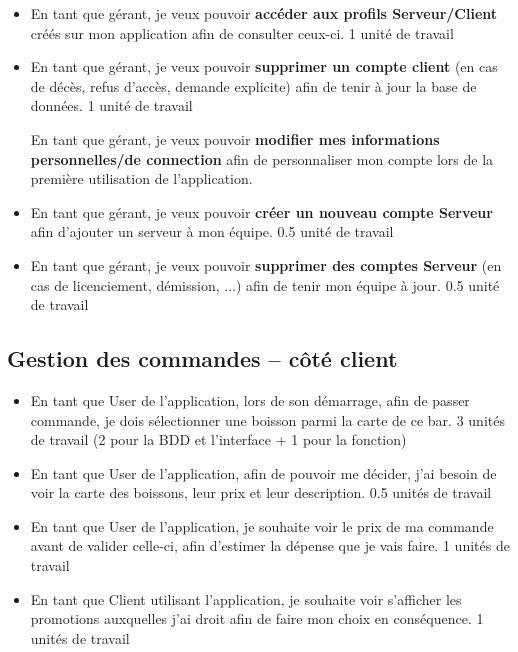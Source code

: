 \documentclass[11pt,a4paper]{article}
\begin{document}
\begin{spacing}{1.1}
\begin{itemize}[label=\textbullet,font=\color{cyan}]
\item En tant que gérant, je veux pouvoir \textbf{accéder aux profils Serveur/Client} créés sur mon application afin de consulter ceux-ci.
{\color{cyan} 1 unité de travail}

\item En tant que gérant, je veux pouvoir \textbf{supprimer un compte client} (en cas de décès, refus d'accès, demande explicite) afin de tenir à jour la base de données.
{\color{cyan} 1 unité de travail}

En tant que gérant, je veux pouvoir \textbf{modifier mes informations personnelles/de connection} afin de personnaliser mon compte lors de la première utilisation de l'application.

\item En tant que gérant, je veux pouvoir \textbf{créer un nouveau compte Serveur} afin d'ajouter un serveur à mon équipe.
{\color{cyan} 0.5 unité de travail}

\item En tant que gérant, je veux pouvoir \textbf{supprimer des comptes Serveur} (en cas de licenciement, démission, ...) afin de tenir mon équipe à jour.
{\color{cyan} 0.5 unité de travail}
\end{itemize}


\subsection{Gestion des commandes -- côté client}

\begin{itemize}[label=\textbullet,font=\color{cyan}]
\item En tant que User de l'application, lors de son démarrage, afin de passer commande, je dois sélectionner une boisson parmi la carte de ce bar.
{\color{cyan} 3 unités de travail (2 pour la BDD et l'interface + 1 pour la fonction)}

\item En tant que User de l'application, afin de pouvoir me décider, j'ai besoin de voir la carte des boissons, leur prix et leur description.
{\color{cyan} 0.5 unités de travail}

\item En tant que User de l'application, je souhaite voir le prix de ma commande avant de valider celle-ci, afin d'estimer la dépense que je vais faire.
{\color{cyan} 1 unités de travail}

\item En tant que Client utilisant l'application, je souhaite voir s'afficher les promotions auxquelles j'ai droit afin de faire mon choix en conséquence.
{\color{cyan} 1 unités de travail}
\end{itemize}



\end{spacing}
\end{document}
